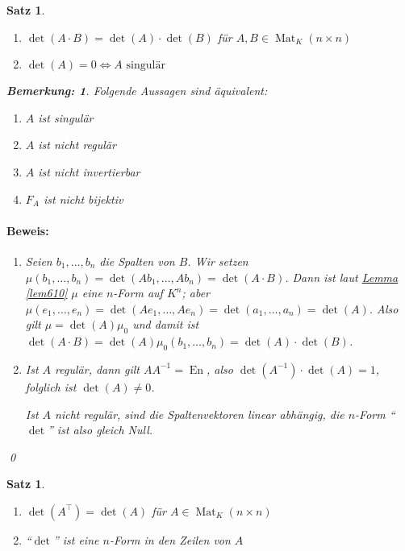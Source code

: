 \documentclass{report}
\DeclareMathOperator{\Mat}{Mat}
\DeclareMathOperator{\En}{En}
\theoremstyle{customrem}
\newtheorem*{bemerkung}{Bemerkung\textnormal:}
\theoremstyle{customdef}
\newtheorem{satz}[definition]{Satz}
\renewenvironment{proof}{\paragraph{Beweis: }}{\qed}
\begin{document}
	\begin{satz}\( \)\vspace{-.5cm} %
		\begin{enumerate}
			\item \(\det(A\cdot B) = \det(A)\cdot\det(B)\) für \(A,B\in\Mat_K(n\times n)\)
			\item \(\det(A) = 0\iff A\text{ singulär}\)
		\end{enumerate}
		\begin{bemerkung}
			Folgende Aussagen sind äquivalent:
			\begin{enumerate}[leftmargin=6cm]
				\item \(A\) ist singulär
				\item \(A\) ist nicht regulär
				\item \(A\) ist nicht invertierbar
				\item \(F_A\) ist nicht bijektiv
			\end{enumerate} 
		\end{bemerkung}
		\begin{proof}
			\begin{enumerate}
				\item Seien \(b_1,\ldots, b_n\) die Spalten von \(B\). Wir setzen \(\mu(b_1,\ldots, b_n) = \det(Ab_1,\ldots, Ab_n) = \det(A\cdot B)\). Dann ist laut \hyperref[lem610]{Lemma \ref*{lem610}} \(\mu\) eine \(n\)-Form auf \(K^n\); aber \(\mu(e_1,\ldots, e_n) = \det(Ae_1,\ldots, Ae_n) = \det(a_1,\ldots, a_n) = \det(A)\). Also gilt \(\mu=\det(A)\mu_0\) und damit ist \(\det(A\cdot B) = \det(A)\mu_0(b_1,\ldots, b_n)=\det(A)\cdot\det(B)\).
				\item Ist \(A\) regulär, dann gilt \(AA^{-1}=\En\), also \(\det(A^{-1})\cdot\det(A)=1\), folglich ist \(\det(A)\neq 0\).
				
				Ist \(A\) nicht regulär, sind die Spaltenvektoren linear abhängig, die \(n\)-Form "`\(\det\)"' ist also gleich Null.
			\end{enumerate}
		\end{proof}
	\end{satz}
	
	\begin{satz}\( \)\vspace{-.5cm} %
		\begin{enumerate}
			\item \(\det(A^\top) = \det(A)\) für \(A\in\Mat_K(n\times n)\)
			\item "`\(\det\)"' ist eine \(n\)-Form in den Zeilen von \(A\)
		\end{enumerate}
	\end{satz}
	
\newpage
\renewcommand{\listtheoremname}{Satz- und Definitionsverzeichnis}
\listoftheorems[ignoreall, show={definition}, show={satz}, show={lemma}, show={definitionn}, show={korrolar}, show={altdefinition}]
\newpage
\printindex
\end{document}
